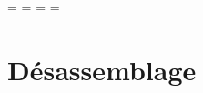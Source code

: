 
\usepackage[disable]{todonotes}


\OddHead={{\leftmark\rightmark}{\hfil\slshape\rightmark}}
\EvenHead={{\leftmark}{{\slshape\leftmark}\hfil}}
\OddFoot={\hfil\thepage}
\EvenFoot={\thepage\hfil}
\pagestyle{ThesisHeadingsII}

\mainmatter 

% 

\chapter{Désassemblage\label{chap:desassembleur}}



% 
% 
% 
\printbibliography



